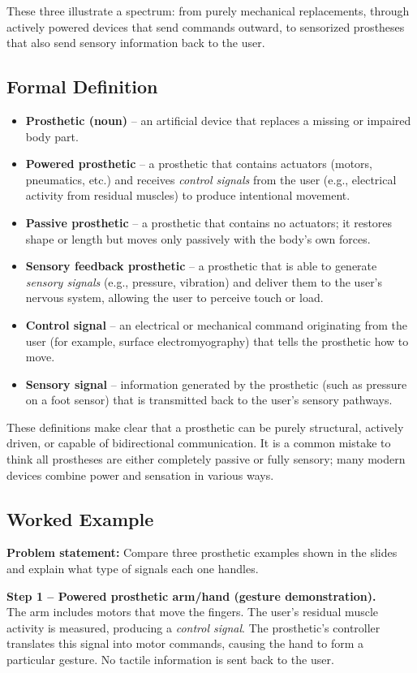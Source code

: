 \documentclass[12pt, a4paper]{article}
\begin{document}
These three illustrate a spectrum: from purely mechanical replacements, through actively powered devices that send commands outward, to sensorized prostheses that also send sensory information back to the user.

\subsection{Formal Definition}
\begin{itemize}
\item \textbf{Prosthetic (noun)} -- an artificial device that replaces a missing or impaired body part.
\item \textbf{Powered prosthetic} -- a prosthetic that contains actuators (motors, pneumatics, etc.) and receives \emph{control signals} from the user (e.g., electrical activity from residual muscles) to produce intentional movement.
\item \textbf{Passive prosthetic} -- a prosthetic that contains no actuators; it restores shape or length but moves only passively with the body's own forces.
\item \textbf{Sensory feedback prosthetic} -- a prosthetic that is able to generate \emph{sensory signals} (e.g., pressure, vibration) and deliver them to the user's nervous system, allowing the user to perceive touch or load.
\item \textbf{Control signal} -- an electrical or mechanical command originating from the user (for example, surface electromyography) that tells the prosthetic how to move.
\item \textbf{Sensory signal} -- information generated by the prosthetic (such as pressure on a foot sensor) that is transmitted back to the user's sensory pathways.
\end{itemize}
These definitions make clear that a prosthetic can be purely structural, actively driven, or capable of bidirectional communication.  It is a common mistake to think all prostheses are either completely passive or fully sensory; many modern devices combine power and sensation in various ways.

\subsection{Worked Example}
\textbf{Problem statement:}  Compare three prosthetic examples shown in the slides and explain what type of signals each one handles.

\textbf{Step 1 -- Powered prosthetic arm/hand (gesture demonstration).}\\
The arm includes motors that move the fingers.  The user's residual muscle activity is measured, producing a \emph{control signal}.  The prosthetic's controller translates this signal into motor commands, causing the hand to form a particular gesture.  No tactile information is sent back to the user.
\end{document}
